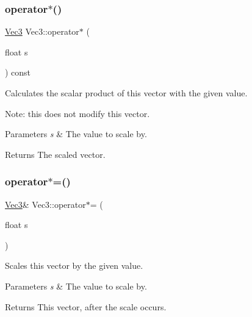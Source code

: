 \subsubsection{\texorpdfstring{operator$\ast$()}{operator*()}\hspace{0.1cm}{\footnotesize\ttfamily [2/2]}}
{\footnotesize\ttfamily \hyperlink{classVec3}{Vec3} Vec3\+::operator$\ast$ (\begin{DoxyParamCaption}\item[{float}]{s }\end{DoxyParamCaption}) const\hspace{0.3cm}{\ttfamily [inline]}}

Calculates the scalar product of this vector with the given value.

Note\+: this does not modify this vector.


\begin{DoxyParams}{Parameters}
{\em s} & The value to scale by. \\
\hline
\end{DoxyParams}
\begin{DoxyReturn}{Returns}
The scaled vector. 
\end{DoxyReturn}
\mbox{\label{classVec3_aa8e89c357d3f284ec2cfdc4e84cb674d}} 
\subsubsection{\texorpdfstring{operator$\ast$=()}{operator*=()}\hspace{0.1cm}{\footnotesize\ttfamily [1/2]}}
{\footnotesize\ttfamily \hyperlink{classVec3}{Vec3}\& Vec3\+::operator$\ast$= (\begin{DoxyParamCaption}\item[{float}]{s }\end{DoxyParamCaption})\hspace{0.3cm}{\ttfamily [inline]}}

Scales this vector by the given value.


\begin{DoxyParams}{Parameters}
{\em s} & The value to scale by. \\
\hline
\end{DoxyParams}
\begin{DoxyReturn}{Returns}
This vector, after the scale occurs. 
\end{DoxyReturn}
\mbox{\label{classVec3_acec2298667a91c9961f3bf3a4a485088}} 
